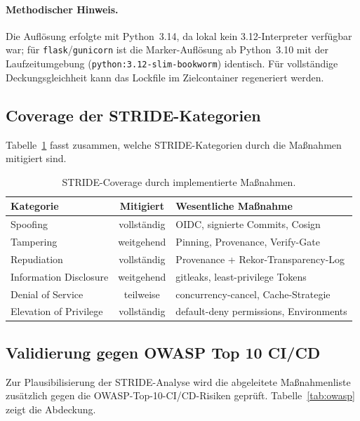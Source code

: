 \documentclass[12pt, a4paper]{scrartcl}
\begin{document}
\paragraph{Methodischer Hinweis.}
Die Auflösung erfolgte mit Python~3.14, da lokal kein 3.12-Interpreter
verfügbar war; für \texttt{flask}/\texttt{gunicorn} ist die
Marker-Auflösung ab Python~3.10 mit der Laufzeitumgebung
(\texttt{python:3.12-slim-bookworm}) identisch. Für vollständige
Deckungsgleichheit kann das Lockfile im Zielcontainer regeneriert werden.

\subsection{Coverage der STRIDE-Kategorien}
Tabelle~\ref{tab:coverage} fasst zusammen, welche STRIDE-Kategorien durch die
Maßnahmen mitigiert sind.

\begin{table}[h]
\centering
\begin{tabular}{lcl}
\toprule
\textbf{Kategorie} & \textbf{Mitigiert} & \textbf{Wesentliche Maßnahme} \\
\midrule
Spoofing & vollständig & OIDC, signierte Commits, Cosign \\
Tampering & weitgehend & Pinning, Provenance, Verify-Gate \\
Repudiation & vollständig & Provenance + Rekor-Transparency-Log \\
Information Disclosure & weitgehend & gitleaks, least-privilege Tokens \\
Denial of Service & teilweise & concurrency-cancel, Cache-Strategie \\
Elevation of Privilege & vollständig & default-deny permissions, Environments \\
\bottomrule
\end{tabular}
\caption{STRIDE-Coverage durch implementierte Maßnahmen.}
\label{tab:coverage}
\end{table}

\subsection{Validierung gegen OWASP Top 10 CI/CD}\label{sec:owasp}
Zur Plausibilisierung der STRIDE-Analyse wird die abgeleitete
Maßnahmenliste zusätzlich gegen die OWASP-Top-10-CI/CD-Risiken
\cite{owaspcicd} geprüft. Tabelle~\ref{tab:owasp} zeigt die Abdeckung.
\end{document}
